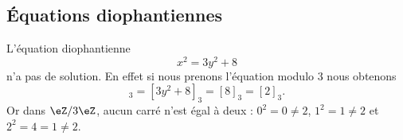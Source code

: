 \subsection{Équations diophantiennes}

\begin{example} \label{ExZPVFooPpdKJc}
	L'équation diophantienne
	\begin{equation}
		x^2=3y^2+8
	\end{equation}
	n'a pas de solution. En effet si nous prenons l'équation modulo \( 3\) nous obtenons
	\begin{equation}
		[x^2]_3=[3y^2+8]_3=[8]_3=[2]_3.
	\end{equation}
	Or dans \( \eZ/3\eZ\), aucun carré n'est égal à deux : \( 0^2=0\neq 2\), \( 1^2=1\neq 2\) et \( 2^2=4=1\neq 2\).
\end{example}

